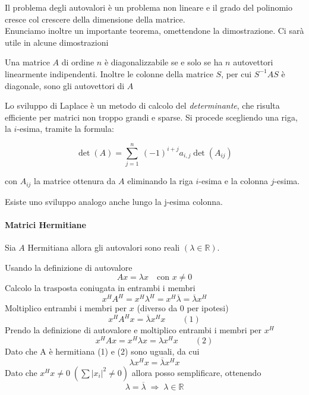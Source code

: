 Il problema degli autovalori \`e un problema non lineare e il grado del
polinomio cresce col crescere della dimensione della matrice.\\

Enunciamo inoltre un importante teorema, omettendone la dimostrazione.
Ci sar\`a utile in alcune dimostrazioni
\begin{theo}
  \label{eigenvalues:theo004}
  Una matrice $A$ di ordine $n$ \`e diagonalizzabile se e solo
  se ha $n$ autovettori linearmente indipendenti. Inoltre le colonne
  della matrice $S$, per cui $S^{-1}AS$ \`e diagonale, sono gli autovettori
  di $A$
\end{theo}

\begin{defn}
\label{sviluppo-laplace}
Lo sviluppo di Laplace \`e un metodo di calcolo del \emph{determinante}, che
risulta efficiente per matrici non troppo grandi e sparse. Si procede
scegliendo una riga, la $i$-esima, tramite la formula:

$$ \det(A) = \sum_{j=1}^n\ (-1)^{i + j} a_{i,j} \det(A_{ij}) $$

con $A_{ij}$ la matrice ottenura da $A$ eliminando la riga $i$-esima e la colonna
$j$-esima.

Esiste uno sviluppo analogo anche lungo la j-esima colonna.
\end{defn}


\paragraph{Matrici Hermitiane}
\begin{property}
Sia $A$ Hermitiana allora gli autovalori sono reali $(\lambda \in \mathbb{R})$. 
\end{property}

\begin{thproof}
Usando la definizione di autovalore 
$$ Ax = \lambda x \quad \text{con } x \neq 0 $$
Calcolo la trasposta coniugata in entrambi i membri 
$$ x^H A^H = x^H \lambda^H= x^H \overline{\lambda} = \overline{\lambda} x^{H} $$
Moltiplico entrambi i membri per $x$ (diverso da 0 per ipotesi)
$$ x^H A^H x = \overline{\lambda}  x^{H} x \qquad (1) $$
Prendo la definizione di autovalore e moltiplico entrambi i membri per $x^{H}$
$$x^{H} A x = x^{H} \lambda x = \lambda x^{H} x \qquad (2)$$
Dato che A \`e hermitiana (1) e (2) sono uguali, da cui
$$ \lambda x^{H} x = \overline{\lambda} x^{H} x$$
Dato che $x^{H} x \neq 0 \; (\sum |x_i|^{2} \neq 0) $ allora posso
 semplificare, ottenendo
$$ \lambda=\overline{\lambda} \; \Rightarrow \; \lambda \in \mathbb{R} $$
\end{thproof}


